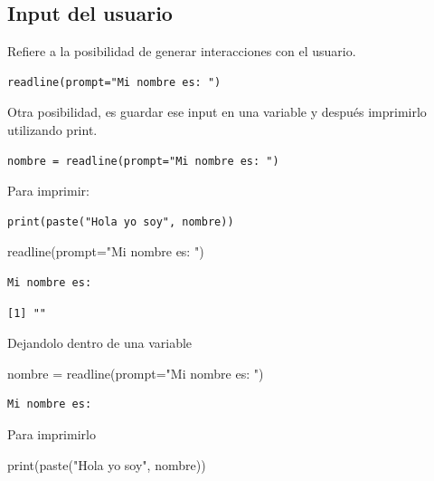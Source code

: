 \documentclass[
  letterpaper,
  DIV=11,
  numbers=noendperiod]{scrartcl}
\newenvironment{Shaded}{\begin{snugshade}}{\end{snugshade}}
\newcommand{\AttributeTok}[1]{\textcolor[rgb]{0.40,0.45,0.13}{#1}}
\newcommand{\FunctionTok}[1]{\textcolor[rgb]{0.28,0.35,0.67}{#1}}
\newcommand{\NormalTok}[1]{\textcolor[rgb]{0.00,0.23,0.31}{#1}}
\newcommand{\OtherTok}[1]{\textcolor[rgb]{0.00,0.23,0.31}{#1}}
\newcommand{\StringTok}[1]{\textcolor[rgb]{0.13,0.47,0.30}{#1}}
\begin{document}
\subsection{Input del usuario}\label{input-del-usuario}

Refiere a la posibilidad de generar interacciones con el usuario.

\begin{verbatim}
readline(prompt="Mi nombre es: ")
\end{verbatim}

Otra posibilidad, es guardar ese input en una variable y después
imprimirlo utilizando print.

\begin{verbatim}
nombre = readline(prompt="Mi nombre es: ")
\end{verbatim}

Para imprimir:

\begin{verbatim}
print(paste("Hola yo soy", nombre))
\end{verbatim}

\begin{Shaded}
\begin{Highlighting}[]
\FunctionTok{readline}\NormalTok{(}\AttributeTok{prompt=}\StringTok{"Mi nombre es: "}\NormalTok{)}
\end{Highlighting}
\end{Shaded}

\begin{verbatim}
Mi nombre es: 
\end{verbatim}

\begin{verbatim}
[1] ""
\end{verbatim}

Dejandolo dentro de una variable

\begin{Shaded}
\begin{Highlighting}[]
\NormalTok{nombre }\OtherTok{=} \FunctionTok{readline}\NormalTok{(}\AttributeTok{prompt=}\StringTok{"Mi nombre es: "}\NormalTok{)}
\end{Highlighting}
\end{Shaded}

\begin{verbatim}
Mi nombre es: 
\end{verbatim}

Para imprimirlo

\begin{Shaded}
\begin{Highlighting}[]
\FunctionTok{print}\NormalTok{(}\FunctionTok{paste}\NormalTok{(}\StringTok{"Hola yo soy"}\NormalTok{, nombre))}
\end{Highlighting}
\end{Shaded}
\end{document}
